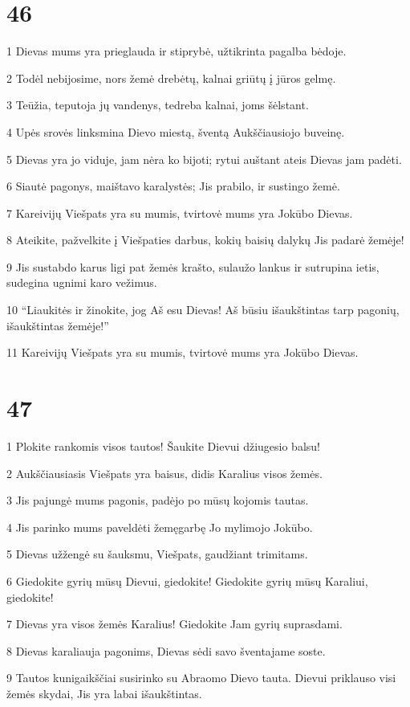 \chapter{46}


\par 1 Dievas mums yra prieglauda ir stiprybė, užtikrinta pagalba bėdoje. 
\par 2 Todėl nebijosime, nors žemė drebėtų, kalnai griūtų į jūros gelmę. 
\par 3 Teūžia, teputoja jų vandenys, tedreba kalnai, joms šėlstant. 
\par 4 Upės srovės linksmina Dievo miestą, šventą Aukščiausiojo buveinę. 
\par 5 Dievas yra jo viduje, jam nėra ko bijoti; rytui auštant ateis Dievas jam padėti. 
\par 6 Siautė pagonys, maištavo karalystės; Jis prabilo, ir sustingo žemė. 
\par 7 Kareivijų Viešpats yra su mumis, tvirtovė mums yra Jokūbo Dievas. 
\par 8 Ateikite, pažvelkite į Viešpaties darbus, kokių baisių dalykų Jis padarė žemėje! 
\par 9 Jis sustabdo karus ligi pat žemės krašto, sulaužo lankus ir sutrupina ietis, sudegina ugnimi karo vežimus. 
\par 10 “Liaukitės ir žinokite, jog Aš esu Dievas! Aš būsiu išaukštintas tarp pagonių, išaukštintas žemėje!” 
\par 11 Kareivijų Viešpats yra su mumis, tvirtovė mums yra Jokūbo Dievas.



\chapter{47}


\par 1 Plokite rankomis visos tautos! Šaukite Dievui džiugesio balsu! 
\par 2 Aukščiausiasis Viešpats yra baisus, didis Karalius visos žemės. 
\par 3 Jis pajungė mums pagonis, padėjo po mūsų kojomis tautas. 
\par 4 Jis parinko mums paveldėti žemę­garbę Jo mylimojo Jokūbo. 
\par 5 Dievas užžengė su šauksmu, Viešpats, gaudžiant trimitams. 
\par 6 Giedokite gyrių mūsų Dievui, giedokite! Giedokite gyrių mūsų Karaliui, giedokite! 
\par 7 Dievas yra visos žemės Karalius! Giedokite Jam gyrių suprasdami. 
\par 8 Dievas karaliauja pagonims, Dievas sėdi savo šventajame soste. 
\par 9 Tautos kunigaikščiai susirinko su Abraomo Dievo tauta. Dievui priklauso visi žemės skydai, Jis yra labai išaukštintas.



